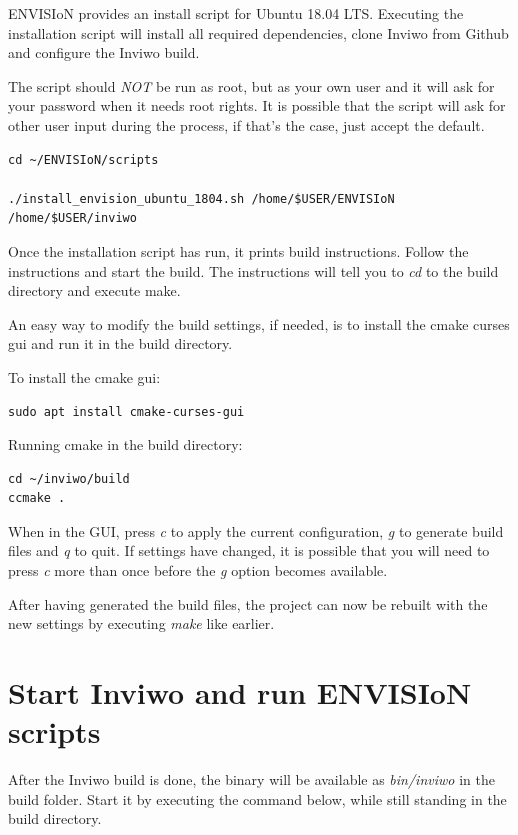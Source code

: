 \documentclass[a4paper,12pt]{article}
\begin{document}
ENVISIoN provides an install script for Ubuntu 18.04 LTS. Executing
the installation script will install all required dependencies, clone
Inviwo from Github and configure the Inviwo build.

The script should \emph{NOT} be run as root, but as your own user and
it will ask for your password when it needs root rights. It is
possible that the script will ask for other user input during the
process, if that's the case, just accept the default.

\begin{lstlisting}[frame = single, breaklines = true]
cd ~/ENVISIoN/scripts

./install_envision_ubuntu_1804.sh /home/$USER/ENVISIoN /home/$USER/inviwo
\end{lstlisting}

Once the installation script has run, it prints build instructions.
Follow the instructions and start the build. The instructions will
tell you to \emph{cd} to the build directory and execute make.

An easy way to modify the build settings, if needed, is to install
the cmake curses gui and run it in the build directory.

To install the cmake gui:
\begin{lstlisting}[frame = single, breaklines = true]
sudo apt install cmake-curses-gui
\end{lstlisting}

Running cmake in the build directory:
\begin{lstlisting}[frame = single, breaklines = true]
cd ~/inviwo/build
ccmake .
\end{lstlisting}

When in the GUI, press \emph{c} to apply the current configuration,
\emph{g} to generate build files and \emph{q} to quit. If settings
have changed, it is possible that you will need to press \emph{c} more
than once before the \emph{g} option becomes available.

After having generated the build files, the project can now be rebuilt
with the new settings by executing \emph{make} like earlier.

\section{Start Inviwo and run ENVISIoN scripts}
After the Inviwo build is done, the binary will be available as
\emph{bin/inviwo} in the build folder. Start it by executing the
command below, while still standing in the build directory.
\end{document}
